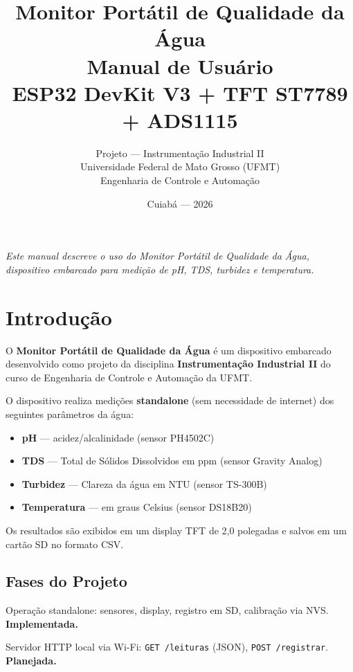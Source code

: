 \documentclass[12pt,a4paper]{article}
\title{
  \vspace{-1cm}
  \textbf{\Huge Monitor Portátil de Qualidade da Água} \\[0.5cm]
  \textbf{\Large Manual de Usuário} \\[0.3cm]
  \large ESP32 DevKit V3 + TFT ST7789 + ADS1115
}
\author{
  Projeto --- Instrumentação Industrial II \\
  Universidade Federal de Mato Grosso (UFMT) \\
  Engenharia de Controle e Automação
}
\date{Cuiabá --- 2026}
\begin{document}
\maketitle
\thispagestyle{empty}
\vspace*{\fill}
\begin{center}
  \textit{Este manual descreve o uso do Monitor Portátil de Qualidade da Água,\\
  dispositivo embarcado para medição de pH, TDS, turbidez e temperatura.}
\end{center}
\newpage

\tableofcontents
\newpage

\section{Introdução}

O \textbf{Monitor Portátil de Qualidade da Água} é um dispositivo embarcado desenvolvido como projeto da disciplina \textbf{Instrumentação Industrial II} do curso de Engenharia de Controle e Automação da UFMT.

O dispositivo realiza medições \textbf{standalone} (sem necessidade de internet) dos seguintes parâmetros da água:

\begin{itemize}[nosep]
  \item \textbf{pH} --- acidez/alcalinidade (sensor PH4502C)
  \item \textbf{TDS} --- Total de Sólidos Dissolvidos em ppm (sensor Gravity Analog)
  \item \textbf{Turbidez} --- Clareza da água em NTU (sensor TS-300B)
  \item \textbf{Temperatura} --- em graus Celsius (sensor DS18B20)
\end{itemize}

Os resultados são exibidos em um display TFT de 2,0 polegadas e salvos em um cartão SD no formato CSV.

\subsection{Fases do Projeto}

\begin{description}[style=nextline]
  \item[Fase 1 --- MVP] Operação standalone: sensores, display, registro em SD, calibração via NVS. \textbf{Implementada.}
  \item[Fase 2 --- Web] Servidor HTTP local via Wi-Fi: \texttt{GET /leituras} (JSON), \texttt{POST /registrar}. \textbf{Planejada.}
\end{description}
\end{document}
